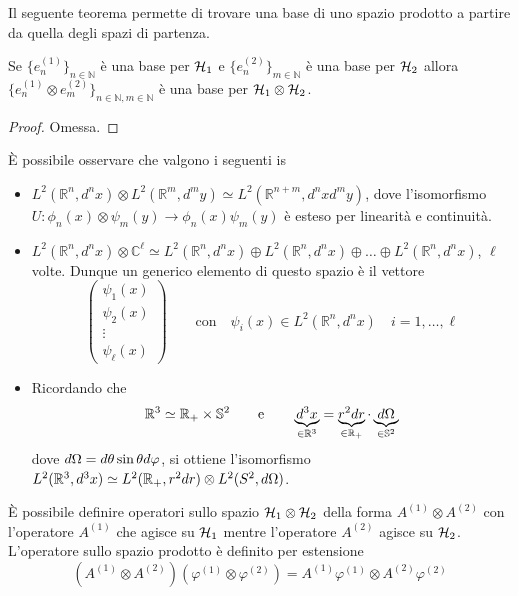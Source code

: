 \documentclass[../../FisicaTeorica.tex]{subfiles}
\begin{document}
Il seguente teorema permette di trovare una base di uno spazio prodotto a partire da quella degli spazi di partenza.
\begin{thm}
Se $\{e_n^{(1)}\}_{n \in \mathbb N}$ è una base per $\mathcal{H}_1$ e $\{e_n^{(2)}\}_{m \in \mathbb N}$ è una base per $\mathcal{H}_2$ allora $\{e_n^{(1)} \otimes e_m^{(2)}\}_{n \in \mathbb N, m \in \mathbb N}$ è una base per $\mathcal{H}_1 \otimes \mathcal{H}_2$.
\end{thm}
\begin{proof}
Omessa.
\end{proof}

È possibile osservare che valgono i seguenti is
\begin{itemize}
\item $L^2(\mathbb R^n, d^n x) \otimes L^2(\mathbb R^m, d^m y) \simeq L^2(\mathbb R^{n+m}, d^n x d^m y)$, dove l’isomorfismo $U: \phi_n(x) \otimes \psi_m(y) \to \phi_n(x) \psi_m(y)$ è esteso per linearità e continuità.
\item $L^2(\mathbb R^n, d^n x) \otimes \mathbb C^\ell \simeq L^2(\mathbb R^n, d^n x) \oplus L^2(\mathbb R^n, d^n x) \oplus \dots \oplus L^2(\mathbb R^n, d^n x)$, $\ell$ volte. Dunque un generico elemento di questo spazio è il vettore 
\[
\begin{pmatrix} \psi_1(x) \\ \psi_2(x) \\ \vdots \\ \psi_\ell(x) \end{pmatrix} \qquad \text{con} \quad  \psi_i(x) \in L^2(\mathbb R^n, d^n x) \quad i = 1, \dots, \ell
\]
\item Ricordando che
\[
\mathbb R^3 \simeq \mathbb R_+ \times \mathbb S^2  \qquad \text{e} \qquad \underbrace{d^3 x}_{\in \mathbb R^3} = \underbrace{r^2 d r}_{\in \mathbb R_+} \cdot \underbrace{d \Omega}_{\in \mathbb S^2}
\]
dove $d \Omega = d \theta \sin\theta d\varphi$, si ottiene l’isomorfismo $L^2(\mathbb R^3, d^3 x) \simeq L^2(\mathbb R_+, r^2 d r) \otimes L^2(S^2, d \Omega)$.
\end{itemize}

\begin{dfn}
È possibile definire operatori sullo spazio $\mathcal{H}_1 \otimes \mathcal{H}_2$ della forma $A^{(1)} \otimes A^{(2)}$ con l’operatore $A^{(1)}$ che agisce su $\mathcal{H}_1$ mentre l’operatore $A^{(2)}$ agisce su $\mathcal{H}_2$.  L’operatore sullo spazio prodotto è definito per estensione
\[
(A^{(1)} \otimes A^{(2)})(\varphi^{(1)} \otimes \varphi^{(2)}) = A^{(1)} \varphi^{(1)} \otimes A^{(2)} \varphi^{(2)}
\]
\end{dfn}
\end{document}
